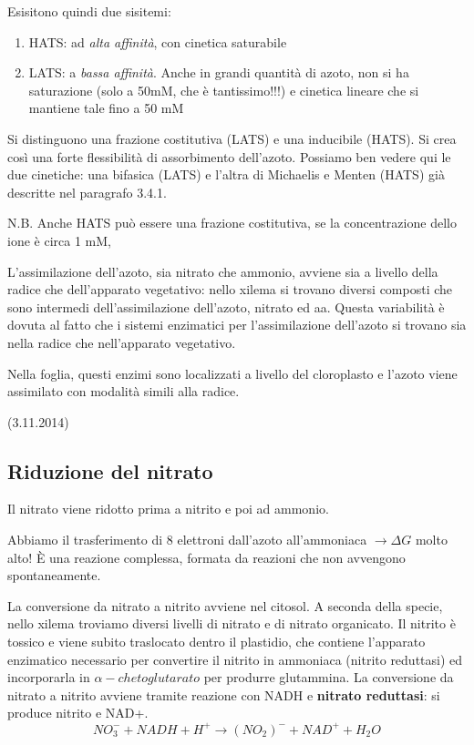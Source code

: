 \documentclass[a4paper,12pt]{book}
\newcommand{\freccia}{\ensuremath{\rightarrow}}
\newcommand{\lfreccia}{\ensuremath{\longrightarrow}}
\begin{document}
Esisitono quindi due sisitemi:
\begin{enumerate}
\item{HATS: ad \emph{alta affinità}, con cinetica saturabile}
\item{LATS: a \emph{bassa affinità}. Anche in grandi quantità di azoto, non si ha saturazione (solo a 50mM, che è tantissimo!!!) e cinetica lineare che si mantiene tale fino a 50 mM}
\end{enumerate}
Si distinguono una frazione costitutiva (LATS) e una inducibile (HATS). Si crea così una forte flessibilità di assorbimento dell'azoto. Possiamo ben vedere qui le due cinetiche: una bifasica (LATS) e l'altra di Michaelis e Menten (HATS) già descritte nel paragrafo 3.4.1.

N.B. Anche HATS può essere una frazione costitutiva, se la concentrazione dello ione è circa 1 mM,

L'assimilazione dell'azoto, sia nitrato che ammonio, avviene sia a livello della radice che dell'apparato vegetativo: nello xilema si trovano diversi composti che sono intermedi dell'assimilazione dell'azoto, nitrato ed aa. 
Questa variabilità è dovuta al fatto che i sistemi enzimatici per l'assimilazione dell'azoto si trovano sia nella radice che nell'apparato vegetativo.

Nella foglia, questi enzimi sono localizzati a livello del cloroplasto e l'azoto viene assimilato con modalità simili alla radice.

(3.11.2014)
\subsection{Riduzione del nitrato}
Il nitrato viene ridotto prima a nitrito e poi ad ammonio. 

Abbiamo il trasferimento di 8 elettroni dall'azoto all'ammoniaca \freccia $\Delta G$ molto alto! È una reazione complessa, formata da reazioni che non avvengono spontaneamente.

La conversione da nitrato a nitrito avviene nel citosol. 
A seconda della specie, nello xilema troviamo diversi livelli di nitrato e di nitrato organicato. Il nitrito è tossico e viene subito traslocato dentro il plastidio, che contiene l'apparato enzimatico necessario per convertire il nitrito in ammoniaca (nitrito reduttasi) ed incorporarla in $\alpha-chetoglutarato$ per produrre glutammina. 
La conversione da nitrato a nitrito avviene tramite reazione con NADH e \textbf{nitrato reduttasi}: si produce nitrito e NAD+.
\begin{equation} 
NO_3^{-} + NADH + H^{+} \lfreccia (NO_{2})^{-} + NAD^{+} + H_{2}O
\end{equation}
\end{document}
